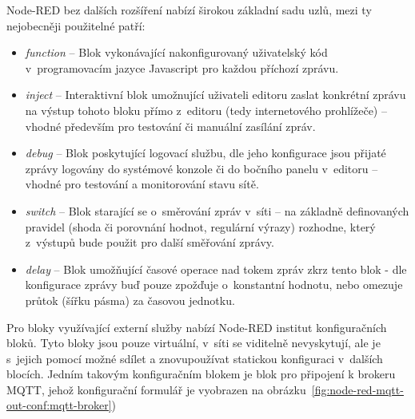 Node-RED bez dalších rozšíření nabízí širokou základní sadu uzlů, mezi ty nejobecněji použitelné patří:

\begin{itemize}
    \item\emph{function} -- Blok vykonávající nakonfigurovaný uživatelský kód v~programovacím jazyce Javascript pro
    každou příchozí zprávu.
    \item\emph{inject} -- Interaktivní blok umožnující uživateli editoru zaslat konkrétní zprávu na výstup tohoto bloku
    přímo z~editoru (tedy internetového prohlížeče) -- vhodné především pro testování či manuální zasílání zpráv.
    \item\emph{debug} -- Blok poskytující logovací službu, dle jeho konfigurace jsou přijaté zprávy logovány do systémové konzole či do
    bočního panelu v~editoru -- vhodné pro testování a monitorování stavu sítě.
    \item\emph{switch} -- Blok starající se o~směrování zpráv v~síti -- na základně definovaných pravidel
    (shoda či porovnání hodnot, regulární výrazy) rozhodne, který z~výstupů bude použit pro další směřování zprávy.
    \item\emph{delay} -- Blok umožňující časové operace nad tokem zpráv zkrz tento blok - dle konfigurace zprávy buď
    pouze zpožďuje o~konstantní hodnotu, nebo omezuje průtok (šířku pásma) za časovou jednotku.
\end{itemize}

Pro bloky využívající externí služby nabízí Node-RED institut konfiguračních bloků.
Tyto bloky jsou pouze virtuální, v~síti se viditelně nevyskytují, ale je
s~jejich pomocí možné sdílet a znovupoužívat statickou konfiguraci v~dalších blocích.
Jedním takovým konfiguračním blokem je blok pro připojení k brokeru MQTT, jehož konfigurační formulář je vyobrazen na
obrázku~\ref{fig:node-red-mqtt-out-conf:mqtt-broker})

